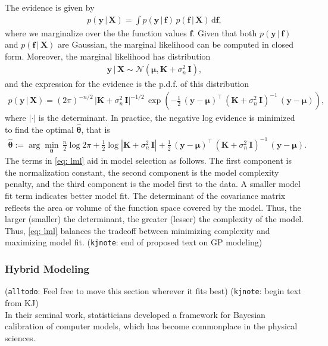 \documentclass[journal=jacsat,manuscript=article]{achemso}
\newcommand{\kjnote}[1]{{\color{Blue} (\texttt{kjnote}: #1)}}
\newcommand{\alltodo}[1]{{\color{Cyan} (\texttt{alltodo}: #1)}}
\newcommand{\xmatrix}{\ensuremath{\mathbf{X}}}
\begin{document}
 The evidence is given by
 \begin{gather*}
     p(\mathbf{y}\, | \, \xmatrix) = \int p(\mathbf{y}\, | \, \mathbf{f}) \,  p(\mathbf{f}\, | \, \xmatrix) \, \text{d}\mathbf{f},
 \end{gather*}
 where we marginalize over the the function values $\mathbf{f}$. Given that both $p(\mathbf{y}\, | \, \mathbf{f})$ and $ p(\mathbf{f}\, | \, \mathbf{X})$ are Gaussian, the marginal likelihood can be computed in closed form. Moreover, the marginal likelihood has distribution
 \begin{gather*}
     \mathbf{y}\, | \, \mathbf{X} \sim \mathcal{N}(\boldsymbol{\mu}, \mathbf{K} + \sigma_n^2 \,\mathbf{I}),
 \end{gather*}
 and the expression for the evidence is the p.d.f. of this distribution
 \begin{gather*}
     p(\mathbf{y}\, | \, \mathbf{X}) = (2\pi)^{-n/2}\,\vert \mathbf{K} + \sigma_n^2 \,\mathbf{I}\vert^{-1/2}\,\exp \left( -\frac{1}{2}\,(\mathbf{y}-\boldsymbol{\mu})^\intercal \, (\mathbf{K} + \sigma_n^2 \,\mathbf{I})^{-1}\,(\mathbf{y}-\boldsymbol{\mu})\right),
 \end{gather*}
 where $|\cdot|$ is the determinant. In practice, the negative log evidence is minimized to find the optimal $\hat{\boldsymbol{\theta}}$, that is
 \begin{gather}
     \hat{\boldsymbol{\theta}} := \arg \min_{\boldsymbol{\theta}} \, \frac{n}{2}\log{2\pi} + \frac{1}{2}\log{|\mathbf{K} + \sigma_n^2 \,\mathbf{I}|} +  \frac{1}{2}\,(\mathbf{y}-\boldsymbol{\mu})^\intercal \, (\mathbf{K} + \sigma_n^2 \,\mathbf{I})^{-1}\,(\mathbf{y}-\boldsymbol{\mu}). \label{eq: lml}
 \end{gather}
 The terms in \eqref{eq: lml} aid in model selection as follows. The first component is the normalization constant, the second component is the model complexity penalty, and the third component is the model first to the data. A smaller model fit term indicates better model fit. The determinant of the covariance matrix reflects the area or volume of the function space covered by the model. Thus, the larger (smaller) the determinant, the greater (lesser) the complexity of the model. Thus, \eqref{eq: lml} balances the tradeoff between minimizing complexity and maximizing model fit.
 \kjnote{end of proposed text on GP modeling}


 \subsubsection{Hybrid Modeling}
 \alltodo{Feel free to move this section wherever it fits best}
 \kjnote{begin text from KJ}\\
 In their seminal work, statisticians \citeauthor{koh} \cite{koh} developed a framework for Bayesian calibration of computer models, which has become commonplace in the physical sciences. \\
\end{document}
